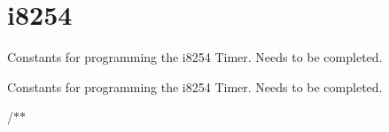 \hypertarget{group__i8254}{}\section{i8254}
\label{group__i8254}


Constants for programming the i8254 Timer. Needs to be completed.  


Constants for programming the i8254 Timer. Needs to be completed. 


\begin{DoxyItemize}
\item /$\ast$$\ast$ 
\end{DoxyItemize}